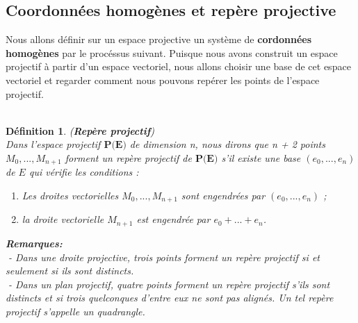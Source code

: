 \documentclass[12pt]{report}
\newtheorem{madef}{Définition}[section]
\begin{document}
\subsection{Coordonnées homogènes et repère projective}
Nous allons définir sur un espace projective un système de \textbf{cordonnées homogènes} par le procéssus suivant. Puisque nous avons construit un espace projectif à partir d'un espace vectoriel, nous allons choisir une base de cet espace vectoriel et regarder comment nous pouvons repérer les points de l'espace projectif.\\
 \\
 
 \begin{madef} (\textbf{Repère projectif})\\
   Dans l’espace projectif $\textbf{P(E)}$ de dimension n, nous dirons que 
   n + 2 points $M_0,. . . ,M_{n+1}$ forment un repère projectif de $\textbf{P(E)}$ s'il existe une base 
   $(e_{0}, . . . , e_{n})$ de $E$ qui vérifie les conditions :
    \begin{enumerate}
    	\item   Les droites vectorielles $M_0,. . . ,M_{n+1}$ sont engendrées par $(e_0, . . . , e_{n})$  ;
    	\item   la droite vectorielle $M_{n+1}$ est engendrée par $e_0 + . . . + e_{n}$.
    \end{enumerate} 
  \textbf{Remarques:} \\
    - Dans une droite projective, trois points forment un repère projectif si et seulement 
  si ils sont distincts. \\
    - Dans un plan projectif, quatre points forment un repère projectif s’ils sont distincts 
  et si trois quelconques d’entre eux ne sont pas alignés. Un tel repère projectif 
  s'appelle un quadrangle. 
  
 \end{madef}
\end{document}
